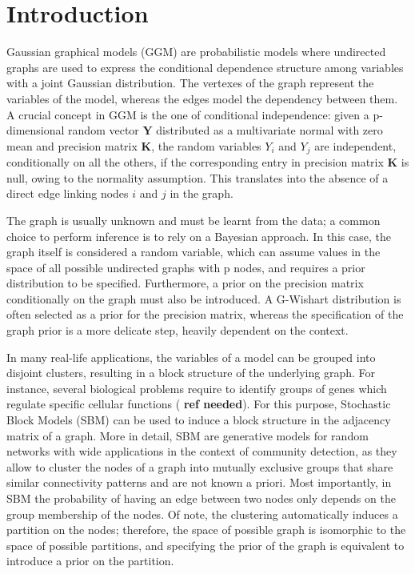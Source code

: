 
\section{Introduction}

Gaussian graphical models (GGM) are probabilistic models where undirected graphs are used to express the conditional dependence structure among variables with a joint Gaussian distribution. The vertexes of the graph represent the variables of the model, whereas the edges model the dependency between them. A crucial concept in GGM is the one of conditional independence: given a p-dimensional random vector $\mathbf{Y}$ distributed as a multivariate normal with zero mean and precision matrix $\mathbf{K}$, the random variables $Y_i$ and $Y_j$ are independent, conditionally on all the others, if the corresponding entry in precision matrix $\mathbf{K}$ is null, owing to the normality assumption. This translates into the absence of a direct edge linking nodes $i$ and $j$ in the graph. 

The graph is usually unknown and must be learnt from the data; a common choice to perform inference is to rely on a Bayesian approach. In this case, the graph itself is considered a random variable, which can assume values in the space of all possible undirected graphs with p nodes, and requires a prior distribution to be specified. Furthermore, a prior on the precision matrix conditionally on the graph must also be introduced. A G-Wishart distribution is often selected as a prior for the precision matrix, whereas the specification of the graph prior is a more delicate step, heavily dependent on the context.

In many real-life applications, the variables of a model can be grouped into disjoint clusters, resulting in a block structure of the underlying graph. For instance, several biological problems require to identify groups of genes which regulate specific cellular functions (\textbf{ ref needed}). For this purpose, Stochastic Block Models (SBM) can be used to induce a block structure in the adjacency matrix of a graph. More in detail, SBM are generative models for random networks with wide applications in the context of community detection, as they allow to cluster the nodes of a graph into mutually exclusive groups that share similar connectivity patterns and are not known a priori. Most importantly, in SBM the probability of having an edge between two nodes only depends on the group membership of the nodes. Of note, the clustering automatically induces a partition on the nodes; therefore, the space of possible graph is isomorphic to the space of possible partitions, and specifying the prior of the graph is equivalent to introduce a prior on the partition.

